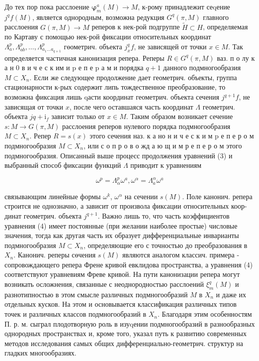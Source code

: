\documentclass[10pt]{article}
\begin{document}
До тех пор пока расслоение $\boldsymbol{\varphi}_{m}^{a}(M) \rightarrow M$, к-рому принадлежит сеqение $j^{q} f(M)$, является однородным, возможна редукция $G^{q}(\pi, M)$ главного расслоения $G(\pi, M) \rightarrow M$ реперов к нек-рой подгруппе $\tilde{H} \subset H$, определяемая по Картаву с помощью нек-рой фиксации относительных координат $\Lambda_{a}^{p}, \Lambda_{a b}^{p}, \ldots, \Lambda_{a_{1} \ldots a_{q+1}}^{p}$ гөометрич. объекта $j_{x}^{q} f$, не зависящей от точки $x \in M$. Так определяется частичная канонизация репера. Реперы $R \in G^{q}(\pi, M)$ ваз. п о лу к а н 0 в и ч е с к им и $\mathrm{p}$ е п е $\mathrm{p}$ а м и порядка $q+1$ данного подмногообразия $M \subset X_{n}$. Если же следующее продолжение дает геометрич. объекты, группа стационарности к-рых содержит липь тождественное преобразование, то возможна фиксация лишь qасти координат геометрич. объекта сечения $j^{q+1} f$, не зависящая от точки $x$, после чего оставшаяся часть координат $\Lambda$ геометрич. объекта $j q+\mathrm{i}_{f}$ зависит только от $x \in M$. Таким образом возникает сечение $s: M \rightarrow G(\pi, M)$ расслоения реперов нулевого порядка подмногообразия $M \subset X_{n}$. Репер $R=s(x)$ этого сечения наз. к а но н и ч е с к и м $\mathrm{p}$ е п е р о м подмногообразия $M \subset X_{n}$, или с о п р о в о жд а ю щ и м р е п е р о м этого подмногообразия. Описанный выше процесс продолжения уравнений (3) и выбранный способ фиксации функций $\Lambda$ приводит к уравнениям



\[

\omega^{p}=\Lambda_{\alpha}^{p} \omega^{a}, \omega^{\alpha}=\Lambda_{a}^{\alpha} \omega^{a}

\]



связывающим линейные формы $\omega^{k}$, $\omega^{\alpha}$ на сечении $s(M)$. Поле канонич. репера строится не однозначно, а зависит от произвола фиксации относительных коор- динат геометрич. объекта $j^{q+1}$. Важно лишь то, что часть коэффициентов уравнения (4) имеет постоянные (при желании наиболее простые) числовые значения, тогда как другая часть их образует дифференциальные инварианты подмногообразия $M \subset X_{n}$, определяющие его с точностью до преобразования в $X_{n}$. Канонич. реперы сөчения $s(M)$ являются аналогом классич. примера - сопровождающего репера Френе кривой евклидова пространства, а уравнения (4) соответствуют уравневиям Фреве кривой. На пути канонизации репера могут возникать осложнения, связанные с неоднородностью расслоений $\xi_{m}^{q}(M)$ и разнотипностью в этом смысле различных подмногообразий $M$ в $X_{n}$ и даже их отдельных кусков. На этом и основывается классификация различных типов точек и различных классов подмногообразий в $X_{n}$. Благодаря этим особенностям П. р. м. сыграл плодотворную роль в изуqении подмногообразий в разнообразных однородных пространствах и, кроме того, указал путь к развитию современных методов исследования самых общих дифференциально-геометрич. структур на гладких многообразиях.
\end{document}
